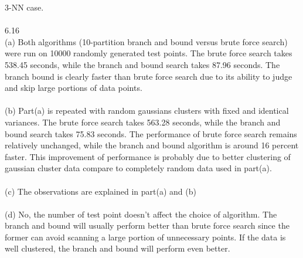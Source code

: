 \documentclass[12pt]{article}
\begin{document}
3-NN case. \\\\
6.16\\%
(a) Both algorithms (10-partition branch and bound versus brute force search) were run on 10000 randomly generated test points. The brute force search takes 538.45 seconds, while the branch and bound search takes 87.96 seconds. The branch bound is clearly faster than brute force search due to its ability to judge and skip large portions of data points.\\\\
(b) Part(a) is repeated with random gaussians clusters with fixed and identical variances. The brute force search takes 563.28 seconds, while the branch and bound search takes 75.83 seconds. The performance of brute force search remains relatively unchanged, while the branch and bound algorithm is around 16 percent faster. This improvement of performance is probably due to better clustering of gaussian cluster data compare to completely random data used in part(a). \\\\
(c) The observations are explained in part(a) and (b)\\\\
(d) No, the number of test point doesn't affect the choice of algorithm. The branch and bound will usually perform better than brute force search since the former can avoid scanning a large portion of unnecessary points. If the data is well clustered, the branch and bound will perform even better.
\end{document}
